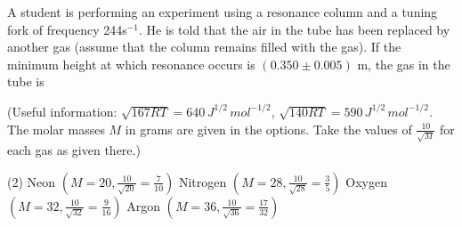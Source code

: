 
\item A student is performing an experiment using a resonance column and a tuning fork of frequency 244s$^{-1}$. He is told that the air in the tube has been replaced by another gas (assume that the column remains filled with the gas). If the minimum height at which resonance occurs is $(0.350 \pm 0.005)$ m, the gas in the tube is

(Useful information: $\sqrt{167RT} = 640 \, J^{1/2}\,mol^{-1/2}$, $\sqrt{140RT} = 590 \, J^{1/2}\,mol^{-1/2}$. The molar masses $M$ in grams are given in the options. Take the values of $\frac{10}{\sqrt{M}}$ for each gas as given there.)

\begin{tasks}(2)
\task Neon $(M = 20, \frac{10}{\sqrt{20}} = \frac{7}{10})$
\task Nitrogen $(M = 28, \frac{10}{\sqrt{28}} = \frac{3}{5})$
\task Oxygen $(M = 32, \frac{10}{\sqrt{32}} = \frac{9}{16})$
\task Argon $(M = 36, \frac{10}{\sqrt{36}} = \frac{17}{32})$
\end{tasks}
